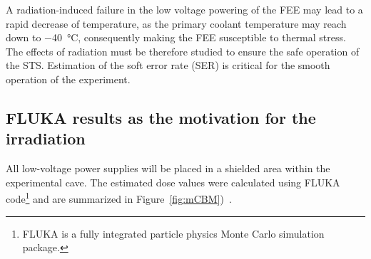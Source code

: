 A radiation-induced failure in the low voltage powering of the FEE may lead to a rapid decrease of temperature, as the primary coolant temperature may reach down to \SI{-40}{\celsius}, consequently making the FEE susceptible to thermal stress. The effects of radiation must be therefore studied to ensure the safe operation of the \gls{STS}. Estimation of the soft error rate (\gls{SER}) is critical for the smooth operation of the experiment.

\subsection{FLUKA results as the motivation for the irradiation}

All low-voltage power supplies will be placed in a shielded area within the experimental cave. The estimated dose values were calculated using FLUKA code\footnote{FLUKA is a fully integrated particle physics Monte Carlo simulation package.} and are summarized in Figure~\ref{fig:mCBM})~\cite{FLUKA}. 

